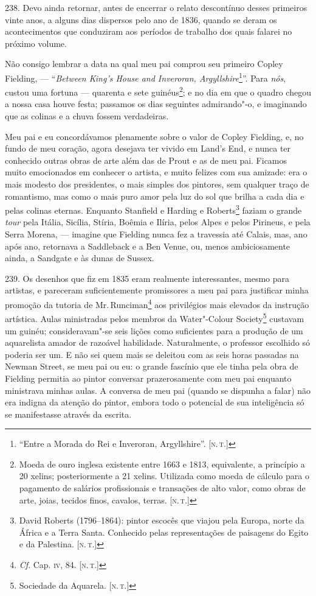 238. Devo ainda retornar, antes de encerrar o relato descontínuo desses
primeiros vinte anos, a alguns dias dispersos pelo ano de 1836, quando
se deram os acontecimentos que conduziram aos períodos de trabalho dos
quais falarei no próximo volume.

Não consigo lembrar a data na qual meu pai comprou seu primeiro Copley
Fielding, --- ``\emph{Between King's House and Inveroran,
Argyllshire}\footnote{``Entre a Morada do Rei e Inveroran, Argyllshire''.
  {[}\textsc{n.\,t.}{]}}''. Para \emph{nós}, custou uma fortuna ---
quarenta e sete guinéus\footnote{Moeda de ouro inglesa existente entre
  1663 e 1813, equivalente, a princípio a 20 xelins; posteriormente a 21
  xelins. Utilizada como moeda de cálculo para o pagamento de salários
  profissionais e transações de alto valor, como obras de arte, joias,
  tecidos finos, cavalos, terras. {[}\textsc{n.\,t.}{]}}; e no dia em que o
quadro chegou a nossa casa houve festa; passamos os dias seguintes
admirando"-o, e imaginando que as colinas e a chuva fossem verdadeiras.

Meu pai e eu concordávamos plenamente sobre o valor de Copley Fielding,
e, no fundo de meu coração, agora desejava ter vivido em Land's End, e
nunca ter conhecido outras obras de arte além das de Prout e as de meu
pai. Ficamos muito emocionados em conhecer o artista, e muito felizes
com sua amizade: era o mais modesto dos presidentes, o mais simples dos
pintores, sem qualquer traço de romantismo, mas como o mais puro amor
pela luz do sol que brilha a cada dia e pelas colinas eternas. Enquanto
Stanfield e Harding e Roberts\footnote{David Roberts (1796--1864): pintor
  escocês que viajou pela Europa, norte da África e a Terra Santa.
  Conhecido pelas representações de paisagens do Egito e da Palestina.
  {[}\textsc{n.\,t.}{]}} faziam o grande \emph{tour} pela Itália, Sicília,
Stíria, Boêmia e Ilíria, pelos Alpes e pelos Pirineus, e pela Serra
Morena, --- imagine que Fielding nunca fez a travessia até Calais, mas,
ano após ano, retornava a Saddleback e a Ben Venue, ou, menos
ambiciosamente ainda, a Sandgate e às dunas de Sussex.

239. Os desenhos que fiz em 1835 eram realmente interessantes, mesmo
para artistas, e pareceram suficientemente promissores a meu pai para
justificar minha promoção da tutoria de Mr.\,Runciman\footnote{\emph{Cf}.
  Cap. \textsc{iv}, 84. {[}\textsc{n.\,t.}{]}} aos privilégios mais elevados da instrução
artística. Aulas ministradas pelos membros da Water"-Colour
Society\footnote{Sociedade da Aquarela. {[}\textsc{n.\,t.}{]}} custavam um
guinéu; consideravam"-se seis lições como suficientes para a produção de
um aquarelista amador de razoável habilidade. Naturalmente, o professor
escolhido só poderia ser um. E não sei quem mais se deleitou com as seis
horas passadas na Newman Street, se meu pai ou eu: o grande fascínio que
ele tinha pela obra de Fielding permitia ao pintor conversar
prazerosamente com meu pai enquanto ministrava minhas aulas. A conversa
de meu pai (quando se dispunha a falar) não era indigna da atenção do
pintor, embora todo o potencial de sua inteligência só se manifestasse
através da escrita.

